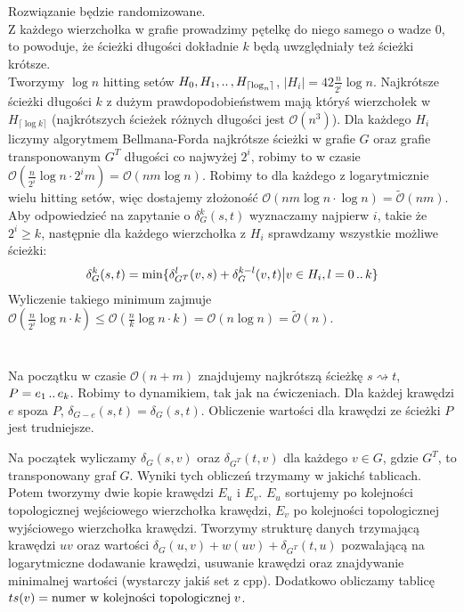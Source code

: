 \documentclass[11pt]{article}
\newcommand{\dd}{\mathinner{{\ldotp}{\ldotp}}}
\begin{document}
\section{}
Rozwiązanie będzie randomizowane.\\
Z każdego wierzchołka w grafie prowadzimy pętelkę do niego samego o wadze $0$,
to powoduje, że ścieżki długości dokładnie $k$ będą uwzględniały też ścieżki
krótsze.\\
Tworzymy $\log{n}$ hitting setów $H_0,H_1,\dd,H_{\lceil\log_{n}\rceil}$, $|H_i|
= 42\frac{n}{2^i}\log{n}$. Najkrótsze ścieżki długości $k$ z dużym
prawdopodobieństwem mają któryś wierzchołek w $H_{\lceil\log{k}\rceil}$
(najkrótszych ścieżek różnych długości jest $\mathcal{O}(n^3)$). Dla każdego
$H_i$ liczymy algorytmem Bellmana-Forda najkrótsze ścieżki w grafie $G$ oraz
grafie transponowanym $G^T$ długości co najwyżej $2^i$, robimy to w czasie
$\mathcal{O}(\frac{n}{2^i}\log{n} \cdot 2^i m) = \mathcal{O}(nm\log{n})$.
Robimy to dla każdego z logarytmicznie wielu hitting setów, więc dostajemy
złożoność $\mathcal{O}(nm\log{n} \cdot \log{n}) = \tilde{\mathcal{O}}(nm)$.\\
Aby odpowiedzieć na zapytanie o $\delta_G^k(s,t)$ wyznaczamy najpierw $i$,
takie że $2^i \ge k$, następnie dla każdego wierzchołka z $H_i$ sprawdzamy
wszystkie możliwe ścieżki:
$$
\delta_G^k(s,t) = \min \{ \delta_{G^T}^l(v,s) + \delta_G^{k-l}(v,t) \big| v \in H_i, l=0 \dd k \}
$$
Wyliczenie takiego minimum zajmuje $\mathcal{O}(\frac{n}{2^i}\log{n} \cdot k)
\le \mathcal{O}(\frac{n}{k} \log{n} \cdot k) = \mathcal{O}(n\log{n}) =
\tilde{\mathcal{O}}(n)$.

\section{}

Na początku w czasie $\mathcal{O}(n+m)$ znajdujemy najkrótszą ścieżkę $s
\rightsquigarrow t$, $P = e_1 \dd e_k$. Robimy to dynamikiem, tak jak na
ćwiczeniach. Dla każdej krawędzi $e$ spoza $P$, $\delta_{G-e}(s,t) =
\delta_{G}(s,t)$. Obliczenie wartości dla krawędzi ze ścieżki $P$ jest
trudniejsze.

Na początek wyliczamy $\delta_{G}(s,v)$ oraz $\delta_{G^T}(t,v)$ dla każdego $v
\in G$, gdzie $G^T$, to transponowany graf $G$. Wyniki tych obliczeń trzymamy w
jakichś tablicach. Potem tworzymy dwie kopie krawędzi $E_u$ i $E_v$. $E_u$
sortujemy po kolejności topologicznej wejściowego wierzchołka krawędzi, $E_v$
po kolejności topologicznej wyjściowego wierzchołka krawędzi. Tworzymy
strukturę danych trzymającą krawędzi $uv$ oraz wartości $\delta_{G}(u,v) +
w(uv) + \delta_{G^T}(t,u)$ pozwalającą na logarytmiczne dodawanie krawędzi,
usuwanie krawędzi oraz znajdywanie minimalnej wartości (wystarczy jakiś set z
cpp). Dodatkowo obliczamy tablicę $ts(v) = \text{numer w kolejności
topologicznej\;}v$.
\end{document}
